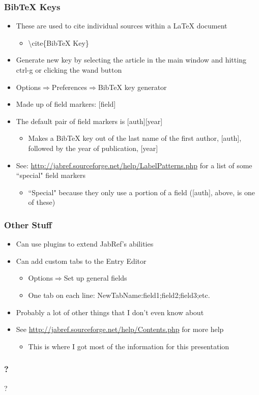 \documentclass[10pt]{beamer}
\begin{document}
\begin{frame}
\frametitle{BibTeX Keys}
\begin{itemize}
\item These are used to cite individual sources within a LaTeX document
	\begin{itemize}
	\item {\textbackslash}cite\{BibTeX Key\}
	\end{itemize}
\item Generate new key by selecting the article in the main window and hitting ctrl-g or clicking the wand button
\item Options$\Rightarrow$Preferences$\Rightarrow$BibTeX key generator
\item Made up of field markers: [field]
\item The default pair of field markers is [auth][year]
	\begin{itemize}
	\item Makes a BibTeX key out of the last name of the first author, [auth], followed by the year of publication, [year]
	\end{itemize}
\item See: \url{http://jabref.sourceforge.net/help/LabelPatterns.php} for a list of some ``special" field markers
	\begin{itemize}
	\item ``Special" because they only use a portion of a field ([auth], above, is one of these)
	\end{itemize}
\end{itemize}
\end{frame}

\begin{frame}
\frametitle{Other Stuff}
\begin{itemize}
\item Can use plugins to extend JabRef's abilities
\item Can add custom tabs to the Entry Editor
	\begin{itemize}
	\item Options$\Rightarrow$Set up general fields
	\item One tab on each line: NewTabName:field1;field2;field3;etc.
	\end{itemize}
\item Probably a lot of other things that I don't even know about
\item See \url{http://jabref.sourceforge.net/help/Contents.php} for more help
	\begin{itemize}
	\item This is where I got most of the information for this presentation
	\end{itemize}
\end{itemize}
\end{frame}

\begin{frame}
\frametitle{?}
\centering\Huge ?
\end{frame}
\end{document}
